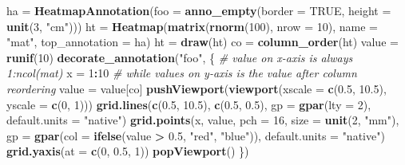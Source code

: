\documentclass[]{book}
\newenvironment{Shaded}{\begin{snugshade}}{\end{snugshade}}
\newcommand{\KeywordTok}[1]{\textcolor[rgb]{0.13,0.29,0.53}{\textbf{#1}}}
\newcommand{\DataTypeTok}[1]{\textcolor[rgb]{0.13,0.29,0.53}{#1}}
\newcommand{\DecValTok}[1]{\textcolor[rgb]{0.00,0.00,0.81}{#1}}
\newcommand{\FloatTok}[1]{\textcolor[rgb]{0.00,0.00,0.81}{#1}}
\newcommand{\StringTok}[1]{\textcolor[rgb]{0.31,0.60,0.02}{#1}}
\newcommand{\CommentTok}[1]{\textcolor[rgb]{0.56,0.35,0.01}{\textit{#1}}}
\newcommand{\OtherTok}[1]{\textcolor[rgb]{0.56,0.35,0.01}{#1}}
\newcommand{\OperatorTok}[1]{\textcolor[rgb]{0.81,0.36,0.00}{\textbf{#1}}}
\newcommand{\NormalTok}[1]{#1}
\theoremstyle{definition}
\theoremstyle{definition}
\theoremstyle{definition}
\theoremstyle{remark}
\begin{document}
\begin{Shaded}
\begin{Highlighting}[]
\NormalTok{ha =}\StringTok{ }\KeywordTok{HeatmapAnnotation}\NormalTok{(}\DataTypeTok{foo =} \KeywordTok{anno_empty}\NormalTok{(}\DataTypeTok{border =} \OtherTok{TRUE}\NormalTok{, }\DataTypeTok{height =} \KeywordTok{unit}\NormalTok{(}\DecValTok{3}\NormalTok{, }\StringTok{"cm"}\NormalTok{)))}
\NormalTok{ht =}\StringTok{ }\KeywordTok{Heatmap}\NormalTok{(}\KeywordTok{matrix}\NormalTok{(}\KeywordTok{rnorm}\NormalTok{(}\DecValTok{100}\NormalTok{), }\DataTypeTok{nrow =} \DecValTok{10}\NormalTok{), }\DataTypeTok{name =} \StringTok{"mat"}\NormalTok{, }\DataTypeTok{top_annotation =}\NormalTok{ ha)}
\NormalTok{ht =}\StringTok{ }\KeywordTok{draw}\NormalTok{(ht)}
\NormalTok{co =}\StringTok{ }\KeywordTok{column_order}\NormalTok{(ht)}
\NormalTok{value =}\StringTok{ }\KeywordTok{runif}\NormalTok{(}\DecValTok{10}\NormalTok{)}
\KeywordTok{decorate_annotation}\NormalTok{(}\StringTok{"foo"}\NormalTok{, \{}
    \CommentTok{# value on x-axis is always 1:ncol(mat)}
\NormalTok{    x =}\StringTok{ }\DecValTok{1}\OperatorTok{:}\DecValTok{10}
    \CommentTok{# while values on y-axis is the value after column reordering}
\NormalTok{    value =}\StringTok{ }\NormalTok{value[co]}
    \KeywordTok{pushViewport}\NormalTok{(}\KeywordTok{viewport}\NormalTok{(}\DataTypeTok{xscale =} \KeywordTok{c}\NormalTok{(}\FloatTok{0.5}\NormalTok{, }\FloatTok{10.5}\NormalTok{), }\DataTypeTok{yscale =} \KeywordTok{c}\NormalTok{(}\DecValTok{0}\NormalTok{, }\DecValTok{1}\NormalTok{)))}
    \KeywordTok{grid.lines}\NormalTok{(}\KeywordTok{c}\NormalTok{(}\FloatTok{0.5}\NormalTok{, }\FloatTok{10.5}\NormalTok{), }\KeywordTok{c}\NormalTok{(}\FloatTok{0.5}\NormalTok{, }\FloatTok{0.5}\NormalTok{), }\DataTypeTok{gp =} \KeywordTok{gpar}\NormalTok{(}\DataTypeTok{lty =} \DecValTok{2}\NormalTok{),}
        \DataTypeTok{default.units =} \StringTok{"native"}\NormalTok{)}
    \KeywordTok{grid.points}\NormalTok{(x, value, }\DataTypeTok{pch =} \DecValTok{16}\NormalTok{, }\DataTypeTok{size =} \KeywordTok{unit}\NormalTok{(}\DecValTok{2}\NormalTok{, }\StringTok{"mm"}\NormalTok{),}
        \DataTypeTok{gp =} \KeywordTok{gpar}\NormalTok{(}\DataTypeTok{col =} \KeywordTok{ifelse}\NormalTok{(value }\OperatorTok{>}\StringTok{ }\FloatTok{0.5}\NormalTok{, }\StringTok{"red"}\NormalTok{, }\StringTok{"blue"}\NormalTok{)), }\DataTypeTok{default.units =} \StringTok{"native"}\NormalTok{)}
    \KeywordTok{grid.yaxis}\NormalTok{(}\DataTypeTok{at =} \KeywordTok{c}\NormalTok{(}\DecValTok{0}\NormalTok{, }\FloatTok{0.5}\NormalTok{, }\DecValTok{1}\NormalTok{))}
    \KeywordTok{popViewport}\NormalTok{()}
\NormalTok{\})}
\end{Highlighting}
\end{Shaded}
\end{document}
